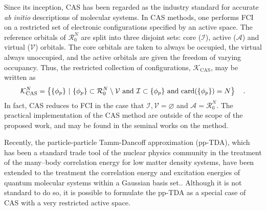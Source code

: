 Since its inception, CAS has been regarded as the industry standard for accurate
\emph{ab initio} descriptions of molecular systems.  In CAS methods, one
performs FCI on a restricted set of electronic configurations specified by an
active space. The reference orbitals of $\mathcal{R}^N_0$ are split into three
disjoint sets: core ($\mathcal{I}$), active ($\mathcal{A}$) and virtual
($\mathcal{V}$) orbitals.  The core orbitals are taken to always be occupied,
the virtual always unoccupied, and the active orbitals are given the freedom of
varying occupancy.  Thus, the restricted collection of configurations,
$\mathcal{K}_\mathrm{CAS}$, may be written as
\begin{equation}
\mathcal{K}^N_\mathrm{CAS} = 
\left\lbrace \{ \phi_p \} \text{ }\vert\text{ } 
\{ \phi_p \} \subset \mathcal{R}^N_0 \setminus \mathcal{V} \text{ and } 
\mathcal{I} \subset \{ \phi_p \} \text{ and }
\mathrm{card}(\{ \phi_p \}) = N \right\rbrace
\quad. \label{eq:CASAnsatz}
\end{equation}
In fact, CAS reduces to FCI in the case that 
$\mathcal{I},\mathcal{V} = \varnothing$ and $\mathcal{A} = \mathcal{R}_0^N$.
The practical implementation of the CAS method are outside of the scope of the
proposed work, and may be found in the seminal works on the method.
\cite{Schlegel92_CPL524,Handy84_CPL315,Handy82_JCP1,Joergensen78_JCP3833}


Recently, the particle-particle Tamm-Dancoff approximation (pp-TDA), which has
been a standard trade tool of the nuclear physics community in the treatment of
the many--body correlation energy for low matter density
systems\cite{SchuckBook_04}, have been extended to the treatment the correlation
energy and excitation energies of quantum molecular systems within a Gaussian 
basis set.\cite{Yang13_224105,Yang13_18A522,
Yang13_174110,Yang13_104112,Yang13_030501,Yang09_066403,Bulik13_104113}.
Although it is not standard to do so, it is possible to formulate the pp-TDA as
a special case of CAS with a very restricted active space.


